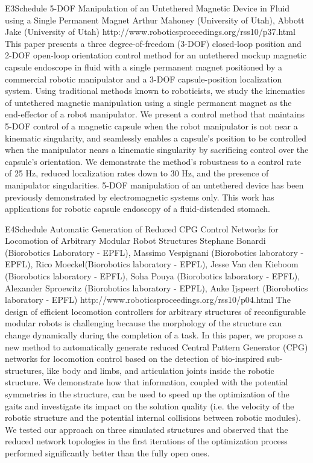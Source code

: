 \begin{spacing}{1.0}
\descriptionPaper
{E3}{Schedule}
{	
5-DOF Manipulation of an Untethered Magnetic Device in Fluid using a Single Permanent Magnet
}
{
Arthur Mahoney (University of Utah), Abbott Jake (University of Utah)
}
{
http://www.roboticsproceedings.org/rss10/p37.html
}
{
This paper presents a three degree-of-freedom (3-DOF) closed-loop position and 2-DOF open-loop orientation control method for an untethered mockup magnetic capsule endoscope in fluid with a single permanent magnet positioned by a commercial robotic manipulator and a 3-DOF capsule-position localization system. Using traditional methods known to roboticists, we study the kinematics of untethered magnetic manipulation using a single permanent magnet as the end-effector of a robot manipulator. We present a control method that maintains 5-DOF control of a magnetic capsule when the robot manipulator is not near a kinematic singularity, and seamlessly enables a capsule’s position to be controlled when the manipulator nears a kinematic singularity by sacrificing control over the capsule’s orientation. We demonstrate the method’s robustness to a control rate of 25 Hz, reduced localization rates down to 30 Hz, and the presence of manipulator singularities. 5-DOF manipulation of an untethered device has been previously demonstrated by electromagnetic systems only. This work has applications for robotic capsule endoscopy of a fluid-distended stomach.
}



\descriptionPaper
{E4}{Schedule}
{	
Automatic Generation of Reduced CPG Control Networks for Locomotion of Arbitrary Modular Robot Structures
}
{
Stephane Bonardi (Biorobotics Laboratory - EPFL), Massimo Vespignani (Biorobotics laboratory - EPFL), Rico Moeckel(Biorobotics laboratory - EPFL), Jesse Van den Kieboom (Biorobotics laboratory - EPFL), Soha Pouya (Biorobotics laboratory - EPFL), Alexander Sproewitz (Biorobotics laboratory - EPFL), Auke Ijspeert (Biorobotics laboratory - EPFL)
}
{
http://www.roboticsproceedings.org/rss10/p04.html
}
{
The design of efficient locomotion controllers for arbitrary structures of reconfigurable modular robots is challenging because the morphology of the structure can change dynamically during the completion of a task. In this paper, we propose a new method to automatically generate reduced Central Pattern Generator (CPG) networks for locomotion control based on the detection of bio-inspired sub-structures, like body and limbs, and articulation joints inside the robotic structure. We demonstrate how that information, coupled with the potential symmetries in the structure, can be used to speed up the optimization of the gaits and investigate its impact on the solution quality (i.e. the velocity of the robotic structure and the potential internal collisions between robotic modules). We tested our approach on three simulated structures and observed that the reduced network topologies in the first iterations of the optimization process performed significantly better than the fully open ones.
}





\end{spacing}
